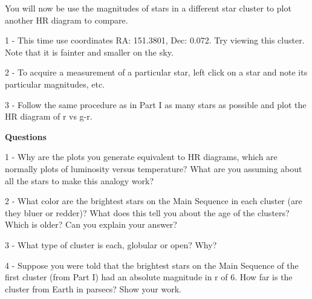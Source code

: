 \documentclass[11pt]{article}
\begin{document}
You will now be use the magnitudes of
stars in a different star cluster to plot another HR diagram to compare.

1 - This time use coordinates RA: 151.3801, Dec: 0.072. Try viewing this cluster. Note that it is fainter and smaller on the sky.

2 - To acquire a measurement of a particular star, left click on a star and note its particular magnitudes, etc.

3 - Follow the same procedure as in Part I as many stars as possible and plot the HR diagram of r vs g-r.

{\bf Questions}

1 - Why are the plots you generate equivalent to HR diagrams, which
are normally plots of luminosity versus temperature? What are you
assuming about all the stars to make this analogy work?

2 - What color are the brightest stars on the Main Sequence in each
cluster (are they bluer or redder)?  What does this tell you about the
age of the clusters?  Which is older? Can you explain your answer?

3 - What type of cluster is each, globular or open?  Why?

4 - Suppose you were told that the brightest stars on the Main
Sequence of the first cluster (from Part I) had an absolute magnitude
in r of 6.  How far is the cluster from Earth in parsecs?  Show your work.
\end{document}

